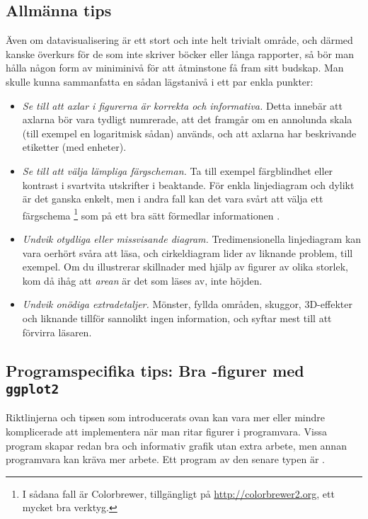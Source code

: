 \documentclass[10pt,../../a4.tex]{subfiles}
\begin{document}
\subsection{Allmänna tips}
Även om datavisualisering är ett stort och inte helt trivialt område, 
och därmed kanske överkurs för de som inte skriver böcker eller långa
rapporter, så bör man hålla någon form av miniminivå för att åtminstone
få fram sitt budskap. Man skulle kunna sammanfatta en sådan lägstanivå
i ett par enkla punkter:
\begin{itemize}
	\item \emph{Se till att axlar i figurerna är korrekta och
		informativa.} Detta innebär att axlarna bör vara tydligt
		numrerade, att det framgår om en annolunda skala (till exempel en
		logaritmisk sådan) används, och att axlarna har beskrivande
		etiketter (med enheter).
	\item \emph{Se till att välja lämpliga färgscheman.} Ta till exempel
		färgblindhet eller kontrast i svartvita utskrifter i beaktande.
		För enkla linjediagram och dylikt är det ganska enkelt, men i
		andra fall kan det vara svårt att välja ett färgschema%
		\footnote{I sådana fall är Colorbrewer, tillgängligt på 
		\url{http://colorbrewer2.org}, ett mycket bra verktyg.} som på
		ett bra sätt förmedlar informationen
		\parencite{Borland07,Moreland09a}.
	\item \emph{Undvik otydliga eller missvisande diagram.}
		Tredimensionella linjediagram kan vara oerhört svåra att läsa,
		och cirkeldiagram lider av liknande problem, till exempel. Om
		du illustrerar skillnader med hjälp av figurer av olika storlek,
		kom då ihåg att \emph{arean} är det som läses av, inte höjden.
	\item \emph{Undvik onödiga extradetaljer.} Mönster, fyllda områden,
		skuggor, 3D-effekter och liknande tillför sannolikt ingen
		information, och syftar mest till att förvirra läsaren.
\end{itemize}

\subsection{Programspecifika tips: %
			   Bra \Rlogo-figurer med \texttt{ggplot2}}
\label{sec:ggplot2}
Riktlinjerna och tipsen som introducerats ovan kan vara mer eller mindre
komplicerade att implementera när man ritar figurer i programvara. Vissa
program skapar redan bra och informativ grafik utan extra arbete, men
annan programvara kan kräva mer arbete. Ett program av den senare typen
är \Rlogo.
\end{document}
